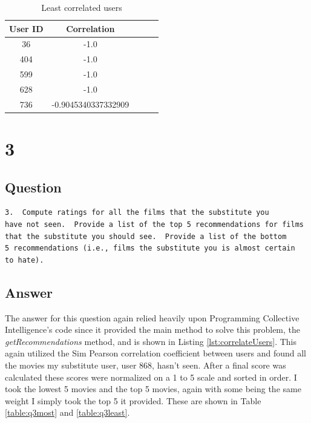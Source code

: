 \documentclass[letterpaper,11pt]{article}
\begin{document}
\begin{table}[htb]
\centering
\begin{tabular}{ | c | c | c | | c | c |}
\hline
\textbf{User ID} & \textbf{Correlation} \\
\hline
36 & -1.0 \\
\hline
404 & -1.0 \\
\hline
599 & -1.0 \\ 
\hline
628 & -1.0 \\
\hline
736 & -0.9045340337332909 \\
\hline
\end{tabular}
\caption{Least correlated users}
\label{table:q2least}
\end{table}

\clearpage

 

\clearpage


\section*{3}

\subsection*{Question}

\begin{verbatim}
3.  Compute ratings for all the films that the substitute you
have not seen.  Provide a list of the top 5 recommendations for films
that the substitute you should see.  Provide a list of the bottom
5 recommendations (i.e., films the substitute you is almost certain
to hate).
\end{verbatim}

\subsection*{Answer}

The answer for this question again relied heavily upon Programming Collective Intelligence's code since it provided the main method to solve this problem, the \textit{getRecommendations} method, and is shown in Listing \ref{lst:correlateUsers}. This again utilized the Sim Pearson correlation coefficient between users and found all the movies my substitute user, user 868, hasn't seen. After a final score was calculated these scores were normalized on a 1 to 5 scale and sorted in order. I took the lowest 5 movies and the top 5 movies, again with some being the same weight I simply took the top 5 it provided. These are shown in Table \ref{table:q3most} and \ref{table:q3least}.
\end{document}
